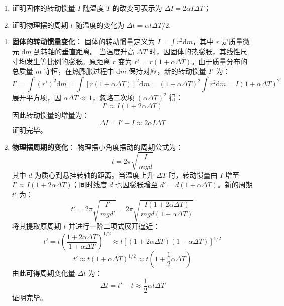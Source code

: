 \begin{exercise}\label{ex:10.3}
\begin{enumerate}
  \item[(a)] 证明固体的转动惯量 $I$ 随温度 $T$ 的改变可表示为 $\Delta I = 2\alpha I \Delta T$；
  \item[(b)] 证明物理摆的周期 $t$ 随温度的变化为 $\Delta t = \alpha t \Delta T / 2$.
\end{enumerate}
\end{exercise}
\begin{solution}
\begin{enumerate}
    \item[(a)] \textbf{固体的转动惯量变化}：
    固体的转动惯量定义为 $I = \int r^2 \mathrm{d}m$，其中 $r$ 是质量微元 $\mathrm{d}m$ 到转轴的垂直距离。
    当温度升高 $\Delta T$ 时，因固体的热膨胀，其线性尺寸均发生等比例的膨胀。原距离 $r$ 变为 $r' = r(1 + \alpha \Delta T)$。由于质量分布的总质量 $m$ 守恒，在热膨胀过程中 $\mathrm{d}m$ 保持对应，新的转动惯量 $I'$ 为：
    $$ I' = \int (r')^2 \mathrm{d}m = \int [r(1 + \alpha \Delta T)]^2 \mathrm{d}m = (1 + \alpha \Delta T)^2 \int r^2 \mathrm{d}m = I (1 + \alpha \Delta T)^2 $$
    展开平方项，因 $\alpha \Delta T \ll 1$，忽略二次项 $(\alpha \Delta T)^2$ 得：
    $$ I' \approx I (1 + 2\alpha \Delta T) $$
    因此转动惯量的增量为：
    $$ \Delta I = I' - I \approx 2\alpha I \Delta T $$
    证明完毕。

    \item[(b)] \textbf{物理摆周期的变化}：
    物理摆小角度摆动的周期公式为：
    $$ t = 2\pi \sqrt{\frac{I}{mgd}} $$
    其中 $d$ 为质心到悬挂转轴的距离。当温度上升 $\Delta T$ 时，转动惯量由 $I$ 增至 $I' \approx I(1 + 2\alpha \Delta T)$；同时线度 $d$ 也因膨胀增至 $d' = d(1 + \alpha \Delta T)$。新的周期 $t'$ 为：
    $$ t' = 2\pi \sqrt{\frac{I'}{mgd'}} = 2\pi \sqrt{\frac{I(1 + 2\alpha \Delta T)}{mgd(1 + \alpha \Delta T)}} $$
    将其提取原周期 $t$ 并进行一阶二项式展开逼近：
    $$ t' = t \left( \frac{1 + 2\alpha \Delta T}{1 + \alpha \Delta T} \right)^{1/2} \approx t \left[ (1 + 2\alpha \Delta T)(1 - \alpha \Delta T) \right]^{1/2} $$
    $$ t' \approx t (1 + \alpha \Delta T)^{1/2} \approx t \left( 1 + \frac{1}{2}\alpha \Delta T \right) $$
    由此可得周期变化量 $\Delta t$ 为：
    $$ \Delta t = t' - t \approx \frac{1}{2} \alpha t \Delta T $$
    证明完毕。
\end{enumerate}
\end{solution}

